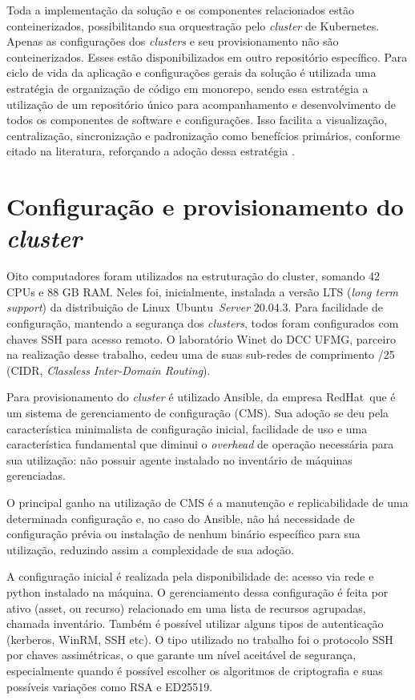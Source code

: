 Toda a implementação da solução e os componentes relacionados estão conteinerizados, possibilitando  sua orquestração pelo  \emph{cluster} de Kubernetes\textregistered. Apenas as configurações dos  \emph{clusters} e seu provisionamento não são conteinerizados. Esses estão disponibilizados em outro repositório específico.
Para ciclo de vida da aplicação e configurações gerais da solução é utilizada uma estratégia de organização de código em monorepo, sendo essa estratégia a utilização de um repositório único para acompanhamento e desenvolvimento de todos os componentes de software e configurações. Isso facilita a visualização, centralização, sincronização e padronização como benefícios primários, conforme citado na literatura, reforçando a adoção dessa estratégia \cite{brito_monorepos_2018}.


\section{Configuração e provisionamento do  \emph{cluster}}

Oito computadores foram utilizados na estruturação do cluster, somando 42 CPUs e 88 GB RAM. Neles foi, inicialmente, instalada a versão LTS (\emph{long term support}) da distribuição de Linux\textregistered \ Ubuntu\textregistered \ \emph{Server} {20.04.3}. Para facilidade de configuração, mantendo a segurança dos \emph{clusters}, todos foram configurados com chaves SSH para acesso remoto. O laboratório Winet do DCC UFMG, parceiro na realização desse trabalho, cedeu uma de suas sub-redes de comprimento /25 (CIDR, \emph{Classless Inter-Domain Routing}).

Para provisionamento do \emph{cluster} é utilizado Ansible\textregistered, da empresa RedHat\textregistered \ que é  um sistema de gerenciamento de configuração (CMS). Sua adoção se deu pela característica minimalista de configuração inicial, facilidade de uso e uma característica fundamental que diminui o \emph{overhead} de operação necessária para sua utilização: não possuir agente instalado no inventário de máquinas gerenciadas.

O principal ganho na utilização de CMS é a manutenção e replicabilidade de uma determinada configuração e, no caso do Ansible, não há necessidade de configuração prévia ou instalação de nenhum binário específico para sua utilização, reduzindo assim a complexidade de sua adoção.

A configuração inicial é realizada pela disponibilidade de: acesso via rede e python instalado na máquina. O gerenciamento dessa  configuração é feita por ativo (asset, ou recurso) relacionado em uma lista de recursos agrupadas, chamada inventário. Também é possível utilizar alguns tipos de autenticação (kerberos, WinRM, SSH etc). O tipo utilizado no trabalho foi o protocolo SSH \cite{noauthor_rfc4254_nodate} por chaves assimétricas, o que garante um nível aceitável de segurança, especialmente quando é possível escolher os algoritmos de criptografia e suas possíveis variações como RSA e ED25519.

